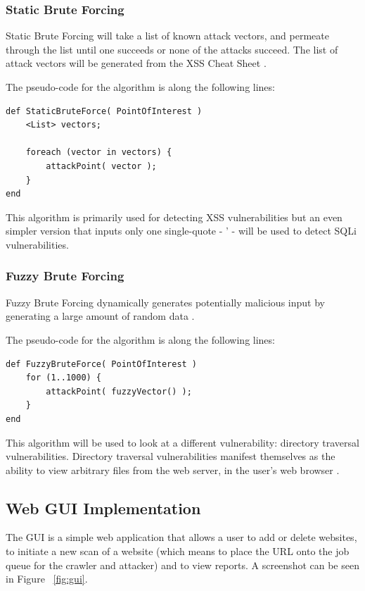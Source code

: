 \documentclass[12pt,a4paper]{article}
\begin{document}
\subsubsection{Static Brute Forcing}
Static Brute Forcing will take a list of known attack vectors, and permeate through the list until one succeeds or none of the attacks succeed.  The list of attack vectors will be generated from the XSS Cheat Sheet \cite{Hansen:2009:Online}.

The pseudo-code for the algorithm is along the following lines:

\begin{lstlisting}
def StaticBruteForce( PointOfInterest )     
    <List> vectors;
    
    foreach (vector in vectors) { 
        attackPoint( vector );
    }
end
\end{lstlisting}

This algorithm is primarily used for detecting XSS vulnerabilities but an even simpler version that inputs only one single-quote - ' - will be used to detect SQLi vulnerabilities.

\subsubsection{Fuzzy Brute Forcing}
Fuzzy Brute Forcing dynamically generates potentially malicious input by generating a large amount of random data \cite{Sutton2007}.

The pseudo-code for the algorithm is along the following lines:

\begin{lstlisting} 
def FuzzyBruteForce( PointOfInterest )
	for (1..1000) { 		
	    attackPoint( fuzzyVector() ); 	
	}
end
\end{lstlisting}
This algorithm will be used to look at a different vulnerability: directory traversal vulnerabilities. Directory traversal vulnerabilities manifest themselves as the ability to view arbitrary files from the web server, in the user's web browser \cite{OWASP:2007:Online}.

\subsection{Web GUI Implementation}
The GUI is a simple web application that allows a user to add or delete websites, to initiate a new scan of a website (which means to place the URL onto the job queue for the crawler and attacker) and to view reports.  A screenshot can be seen in Figure ~\ref{fig:gui}.
\end{document}

